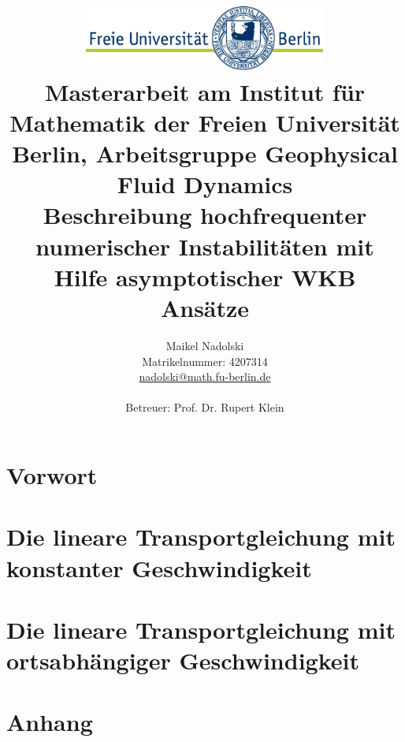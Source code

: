 \documentclass[a4paper
               ,11pt%
               ,openright%
               ,titlepage%
               ,twoside%
               ]{scrreprt}
\title{\includegraphics[width=0.6\textwidth]{pictures/logo}\\
{\normalsize Masterarbeit am Institut für Mathematik der Freien Universität Berlin, Arbeitsgruppe Geophysical Fluid Dynamics}\\[6ex]
Beschreibung hochfrequenter numerischer Instabilitäten mit Hilfe asymptotischer WKB Ansätze}
\author{Maikel Nadolski\\
{\normalsize Matrikelnummer: 4207314}\\
{\normalsize \href{mailto:nadolski@math.fu-berlin.de}{nadolski@math.fu-berlin.de}}
\vspace{3cm}\\\\
{\normalsize Betreuer: Prof. Dr. Rupert Klein}}
\numberwithin{equation}{section}
\begin{document}
\begin{titlepage}

\maketitle
\thispagestyle{empty}




\end{titlepage}

\pagestyle{empty}
\clearpage{}



\tableofcontents

\clearpage{}
\pagestyle{plain}
\setcounter{page}{1}

\chapter{Vorwort}

% 
\chapter{Die lineare Transportgleichung mit konstanter Geschwindigkeit}

\chapter{Die lineare Transportgleichung mit ortsabhängiger Geschwindigkeit}

% 



\appendix

\chapter{Anhang}


\end{document}
